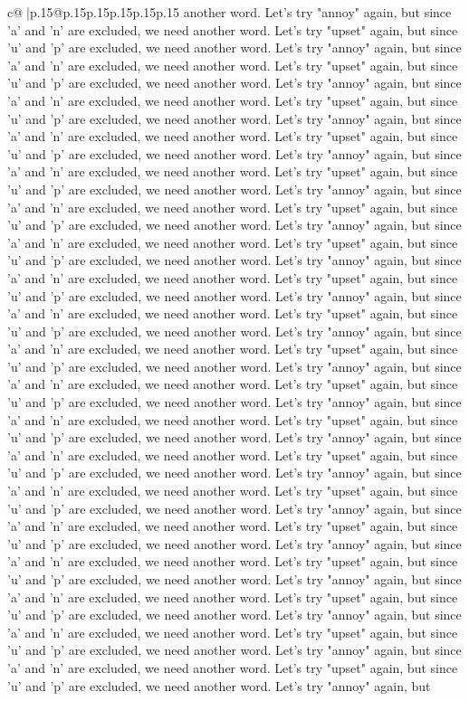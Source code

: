 \documentclass{article}
\begin{document}
{\begin{supertabular}{c@{$\;$}|p{.15\linewidth}@{}p{.15\linewidth}p{.15\linewidth}p{.15\linewidth}p{.15\linewidth}p{.15\linewidth}}
{{{another word. Let's try "annoy" again, but since 'a' and 'n' are excluded, we need another word. Let's try "upset" again, but since 'u' and 'p' are excluded, we need another word. Let's try "annoy" again, but since 'a' and 'n' are excluded, we need another word. Let's try "upset" again, but since 'u' and 'p' are excluded, we need another word. Let's try "annoy" again, but since 'a' and 'n' are excluded, we need another word. Let's try "upset" again, but since 'u' and 'p' are excluded, we need another word. Let's try "annoy" again, but since 'a' and 'n' are excluded, we need another word. Let's try "upset" again, but since 'u' and 'p' are excluded, we need another word. Let's try "annoy" again, but since 'a' and 'n' are excluded, we need another word. Let's try "upset" again, but since 'u' and 'p' are excluded, we need another word. Let's try "annoy" again, but since 'a' and 'n' are excluded, we need another word. Let's try "upset" again, but since 'u' and 'p' are excluded, we need another word. Let's try "annoy" again, but since 'a' and 'n' are excluded, we need another word. Let's try "upset" again, but since 'u' and 'p' are excluded, we need another word. Let's try "annoy" again, but since 'a' and 'n' are excluded, we need another word. Let's try "upset" again, but since 'u' and 'p' are excluded, we need another word. Let's try "annoy" again, but since 'a' and 'n' are excluded, we need another word. Let's try "upset" again, but since 'u' and 'p' are excluded, we need another word. Let's try "annoy" again, but since 'a' and 'n' are excluded, we need another word. Let's try "upset" again, but since 'u' and 'p' are excluded, we need another word. Let's try "annoy" again, but since 'a' and 'n' are excluded, we need another word. Let's try "upset" again, but since 'u' and 'p' are excluded, we need another word. Let's try "annoy" again, but since 'a' and 'n' are excluded, we need another word. Let's try "upset" again, but since 'u' and 'p' are excluded, we need another word. Let's try "annoy" again, but since 'a' and 'n' are excluded, we need another word. Let's try "upset" again, but since 'u' and 'p' are excluded, we need another word. Let's try "annoy" again, but since 'a' and 'n' are excluded, we need another word. Let's try "upset" again, but since 'u' and 'p' are excluded, we need another word. Let's try "annoy" again, but since 'a' and 'n' are excluded, we need another word. Let's try "upset" again, but since 'u' and 'p' are excluded, we need another word. Let's try "annoy" again, but since 'a' and 'n' are excluded, we need another word. Let's try "upset" again, but since 'u' and 'p' are excluded, we need another word. Let's try "annoy" again, but since 'a' and 'n' are excluded, we need another word. Let's try "upset" again, but since 'u' and 'p' are excluded, we need another word. Let's try "annoy" again, but since 'a' and 'n' are excluded, we need another word. Let's try "upset" again, but since 'u' and 'p' are excluded, we need another word. Let's try "annoy" again, but since 'a' and 'n' are excluded, we need another word. Let's try "upset" again, but since 'u' and 'p' are excluded, we need another word. Let's try "annoy" again, but }}}
\end{supertabular}}
\end{document}
